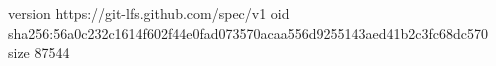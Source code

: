 version https://git-lfs.github.com/spec/v1
oid sha256:56a0c232c1614f602f44e0fad073570acaa556d9255143aed41b2c3fc68dc570
size 87544
